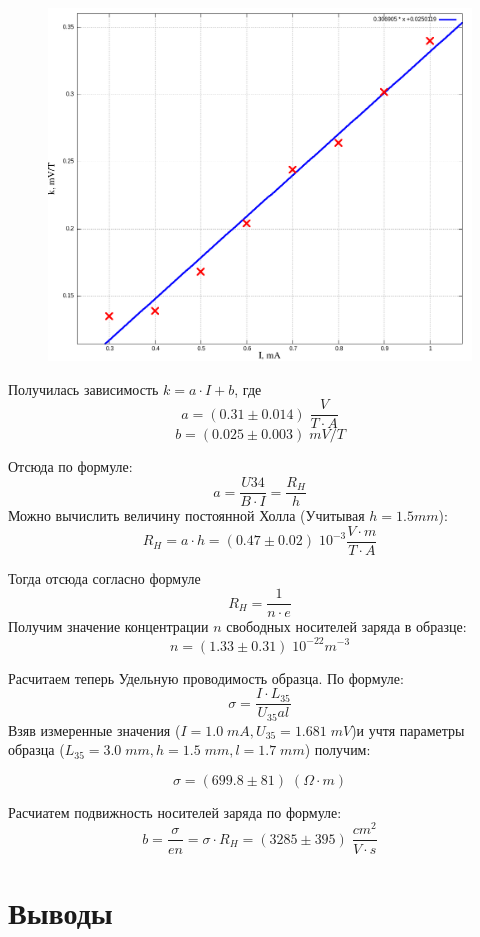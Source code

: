\documentclass{article}
\begin{document}
\begin{figure}[H]
    \centering
    \includegraphics[width=\textwidth]{k-I.png}
\end{figure}

Получилась зависимость \( k = a \cdot I + b \), где
\[ a = (0.31 \pm 0.014)\; \frac{V}{T\cdot A} \]
\[ b = (0.025 \pm 0.003)\; mV/T \]

Отсюда по формуле:
\[ a = \frac{U34}{B\cdot I} = \frac{R_H}{h} \]
Можно вычислить величину постоянной Холла (Учитывая \(h = 1.5 mm\)):
\[ R_H = a\cdot h = (0.47 \pm 0.02) \; 10^{-3}\frac{V\cdot m}{T\cdot A} \]

Тогда отсюда согласно формуле
\[ R_H = \frac{1}{n\cdot e} \]
Получим значение концентрации \(n\) свободных носителей заряда в образце:
\[ n = (1.33 \pm 0.31)\; 10^{-22}m^{-3} \]

Расчитаем теперь Удельную проводимость образца. По формуле:
\[ \sigma = \frac{I\cdot L_{35}}{U_{35}al} \]
Взяв измеренные значения (\( I = 1.0\; mA, U_{35} = 1.681\; mV \))и учтя параметры
образца (\(L_{35} = 3.0\; mm, h = 1.5\; mm, l = 1.7\; mm\)) получим:

\[ \sigma = (699.8 \pm 81)\; (\Omega\cdot m) \]

Расчиатем подвижность носителей заряда по формуле:
\[ b = \frac{\sigma}{en} = \sigma\cdot R_H = (3285 \pm 395)\; \frac{cm^2}{V\cdot s} \]

\section{Выводы}
\end{document}
